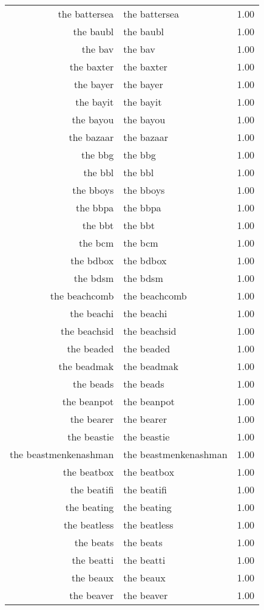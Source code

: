 \begin{table}[ht]
\begin{tabular}{rlr}
  the battersea & the battersea & 1.00 \\ 
  the baubl & the baubl & 1.00 \\ 
  the bav & the bav & 1.00 \\ 
  the baxter & the baxter & 1.00 \\ 
  the bayer & the bayer & 1.00 \\ 
  the bayit & the bayit & 1.00 \\ 
  the bayou & the bayou & 1.00 \\ 
  the bazaar & the bazaar & 1.00 \\ 
  the bbg & the bbg & 1.00 \\ 
  the bbl & the bbl & 1.00 \\ 
  the bboys & the bboys & 1.00 \\ 
  the bbpa & the bbpa & 1.00 \\ 
  the bbt & the bbt & 1.00 \\ 
  the bcm & the bcm & 1.00 \\ 
  the bdbox & the bdbox & 1.00 \\ 
  the bdsm & the bdsm & 1.00 \\ 
  the beachcomb & the beachcomb & 1.00 \\ 
  the beachi & the beachi & 1.00 \\ 
  the beachsid & the beachsid & 1.00 \\ 
  the beaded & the beaded & 1.00 \\ 
  the beadmak & the beadmak & 1.00 \\ 
  the beads & the beads & 1.00 \\ 
  the beanpot & the beanpot & 1.00 \\ 
  the bearer & the bearer & 1.00 \\ 
  the beastie & the beastie & 1.00 \\ 
  the beastmenkenashman & the beastmenkenashman & 1.00 \\ 
  the beatbox & the beatbox & 1.00 \\ 
  the beatifi & the beatifi & 1.00 \\ 
  the beating & the beating & 1.00 \\ 
  the beatless & the beatless & 1.00 \\ 
  the beats & the beats & 1.00 \\ 
  the beatti & the beatti & 1.00 \\ 
  the beaux & the beaux & 1.00 \\ 
  the beaver & the beaver & 1.00 \\ 

\end{tabular}
\end{table}

